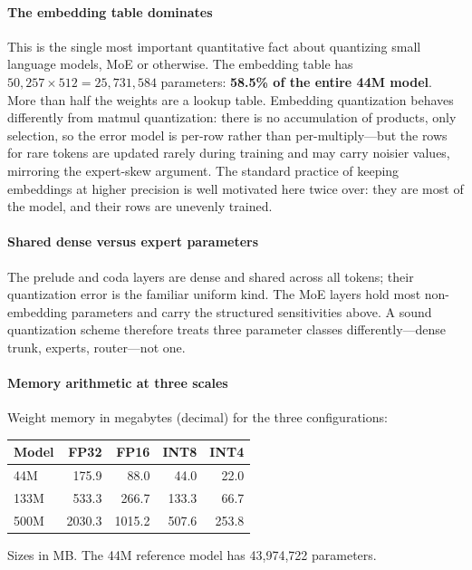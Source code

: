 \paragraph{The embedding table dominates}

This is the single most important quantitative fact about quantizing
small language models, MoE or otherwise. The embedding table has
$50{,}257 \times 512 = 25{,}731{,}584$ parameters: \textbf{58.5\% of
the entire 44M model}. More than half the weights are a lookup table.
Embedding quantization behaves differently from matmul quantization:
there is no accumulation of products, only selection, so the error
model is per-row rather than per-multiply---but the rows for rare
tokens are updated rarely during training and may carry noisier values,
mirroring the expert-skew argument. The standard practice of keeping
embeddings at higher precision is well motivated here twice over:
they are most of the model, and their rows are unevenly trained.

\paragraph{Shared dense versus expert parameters}

The prelude and coda layers are dense and shared across all tokens;
their quantization error is the familiar uniform kind. The MoE layers
hold most non-embedding parameters and carry the structured
sensitivities above. A sound quantization scheme therefore treats
three parameter classes differently---dense trunk, experts, router---not
one.

\paragraph{Memory arithmetic at three scales}

Weight memory in megabytes (decimal) for the three configurations:

\begin{center}
{\footnotesize\setlength{\tabcolsep}{3pt}
\begin{tabular}{lrrrr}
\toprule
Model & FP32 & FP16 & INT8 & INT4 \\
\midrule
44M & 175.9 & 88.0 & 44.0 & 22.0 \\
133M & 533.3 & 266.7 & 133.3 & 66.7 \\
500M & 2030.3 & 1015.2 & 507.6 & 253.8 \\
\bottomrule
\end{tabular}}
\end{center}
Sizes in MB. The 44M reference model has 43,974,722 parameters.

